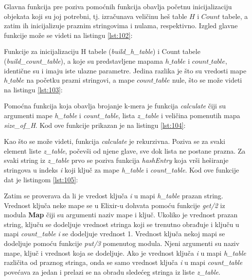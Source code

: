 \documentclass[12pt,oneside]{memoir}
\begin{document}


Glavna funkcija pre poziva pomoćnih funkcija obavlja početnu inicijalizaciju objekata koji su joj potrebni, tj. izračunava veličinu heš table $H$ i $Count$ tabele, a zatim ih inicijalizuje praznim stringovima i nulama, respektivno. Izgled glavne funkcije može se videti na listingu \ref{lst:102}:

\newpage



Funkcije za inicijalizaciju H tabele (\textit{build\_h\_table}) i Count tabele (\textit{build\_count\_table}), a koje su predstavljene mapama $h\_table$ i $count\_table$, identične su i imaju iste ulazne parametre. Jedina razlika je što su vredosti mape $h\_table$ na početku prazni stringovi, a mape $count\_table$ nule, što se može videti na listingu \ref{lst:103}:



Pomoćna funkcija koja obavlja brojanje k-mera je funkcija \textit{calculate} čiji su argumenti mape \textit{h\_table} i \textit{count\_table}, lista \textit{z\_table} i veličina pomenutih mapa \textit{size\_of\_H}. Kod ove funkcije prikazan je na listingu \ref{lst:104}: 

\newpage



Kao što se može videti, funkcija \textit{calculate} je rekurzivna. Poziva se za svaki element liste \textit{z\_table}, počevši od njene glave, sve dok lista ne postane prazna. Za svaki string iz \textit{z\_table} prvo se poziva funkcija \textit{hashEntry} koja vrši heširanje stringova u indeks \textit{i} koji ključ za mape \textit{h\_table} i \textit{count\_table}. Kod ove funkcije dat je listingom \ref{lst:105}:



Zatim se proverava da li je vredost ključa \textit{i} u mapi \textit{h\_table} prazan string. Vrednost ključa neke mape se u Elixir-u dohvata pomoću funkcije \textit{get/2} iz modula \textbf{Map} čiji su argumenti naziv mape i ključ. Ukoliko je vrednost prazan string, ključu se dodeljuje vrednost stringa koji se trenutno obrađuje i ključu u mapi \textit{count\_table} \textit{i} se dodeljuje vrednost 1. Vrednost ključa nekoj mapi se dodeljuje pomoću funkcije \textit{put/3} pomenutog modula. Njeni argumenti su naziv mape, ključ i vrednost koja se dodeljuje. Ako je vrednost ključa \textit{i} u mapi \textit{h\_table} različita od praznog stringa, onda se samo vrednost ključa \textit{i} u mapi \textit{count\_table}  povećava za jedan i prelazi se na obradu sledećeg stringa iz liste \textit{z\_table}. 
\end{document}
